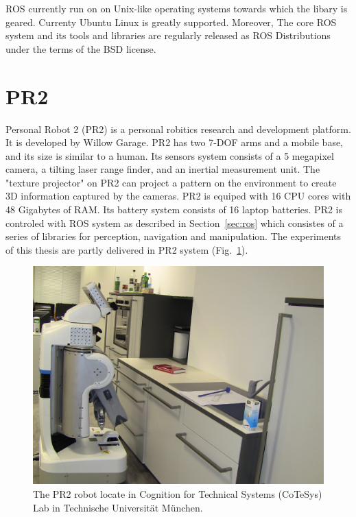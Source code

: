 ROS currently run on on Unix-like operating systems towards which the libary is
geared. Currenty Ubuntu Linux is greatly supported. Moreover, The core
ROS system and its tools and libraries are regularly released as ROS
Distributions~\cite{rosintroduction} under the terms of the BSD license.

\section{PR2}
\label{sec:pr2}
Personal Robot 2 (PR2) is a personal robitics research and development
platform.  It is developed by Willow Garage.  PR2 has two 7-DOF arms and a mobile
base, and its size  is similar to a human. Its sensors system consists of a 5
megapixel camera, a tilting laser range finder, and an inertial
measurement unit. The "texture projector" on PR2 can project a pattern
on the environment to create 3D information captured by the
cameras. PR2 is equiped with 16 CPU cores with 48 Gigabytes of
RAM. Its battery system consists of 16 laptop batteries. PR2 is
controled with ROS system as described in Section~\ref{sec:ros} which
consistes of a series of libraries for perception, navigation and
manipulation.
The experiments of this thesis are partly delivered in PR2 system (Fig.~\ref{fig:pr2}).

\begin{figure}[htbp]
  \centering
\includegraphics[width=\linewidth]{images/pr2.png}
  \caption[A PR2 robot]{The PR2 robot locate in Cognition for
    Technical Systems (CoTeSys) Lab in Technische Universit\"at M\"unchen.}
  \label{fig:pr2}
\end{figure}

